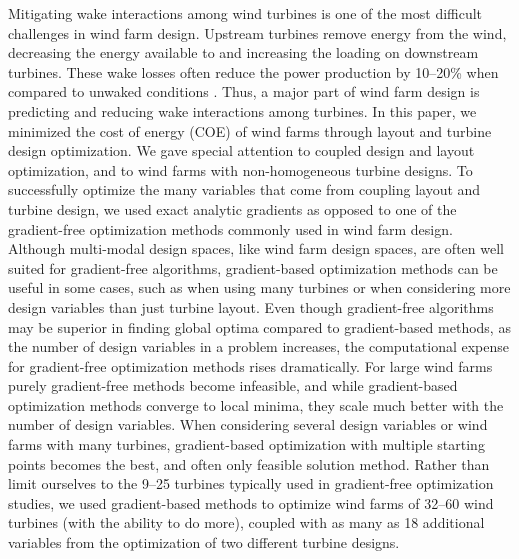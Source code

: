 \documentclass[WESD, manuscript]{copernicus}
\begin{document}


\introduction 
Mitigating wake interactions among wind turbines is one of the most difficult challenges in wind farm design. Upstream turbines remove energy from the wind, decreasing the energy available to and increasing the loading on downstream turbines. These wake losses often reduce the power production by 10--20\% when compared to unwaked conditions \citep{barthelmie2007modelling,barthelmie2009modelling,briggs2013navigating}. 
Thus, a major part of wind farm design is predicting and reducing wake interactions among turbines. 
In this paper, we minimized the cost of energy (COE) of wind farms through layout and turbine design optimization. We gave special attention to coupled design and layout optimization, and to wind farms with non-homogeneous turbine designs.
To successfully optimize the many variables that come from coupling layout and turbine design, we used exact analytic gradients as opposed to one of the gradient-free optimization methods commonly used in wind farm design.
Although multi-modal design spaces, like wind farm design spaces, are often well suited for gradient-free algorithms, gradient-based optimization methods can be useful in some cases, such as when using many turbines or when considering more design variables than just turbine layout. Even though gradient-free algorithms may be superior in finding global optima compared to gradient-based methods, as the number of design variables in a problem increases, the computational expense for gradient-free optimization methods rises dramatically. 
For large wind farms purely gradient-free methods become infeasible, and while gradient-based optimization methods converge to local minima, they scale much better with the number of design variables.
When considering several design variables or wind farms with many turbines,
gradient-based optimization with multiple starting points becomes the best, and often only feasible solution method. Rather than limit ourselves to the 9--25 turbines typically used in gradient-free optimization studies, we used gradient-based methods to optimize wind farms of 32--60 wind turbines (with the ability to do more), coupled with as many as 18 additional variables from the optimization of two different turbine designs.
\end{document}
